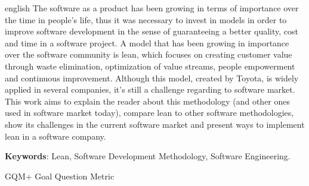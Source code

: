  
\begin{resumo}[ABSTRACT]
 \begin{otherlanguage*}{english}
 The software as a product has been growing in terms of importance over the time in people’s life, thus it was necessary to invest in models in order to improve software development in the sense of guaranteeing a better quality, cost and time in  a software project. A model that has been growing in importance over the software community is lean, which focuses on creating customer value through waste elimination, optimization of value streams, people empowerment and continuous improvement. Although this model, created by Toyota, is widely applied in several companies, it’s still a challenge regarding to software market. This work aims to explain the reader about this methodology (and other ones used in software market today), compare lean to other software methodologies, show its challenges in the current software market and present ways to implement lean in a software company.

\textbf{Keywords}: Lean, Software Development Methodology, Software Engineering.
 \end{otherlanguage*}
\end{resumo}


\listoffigures*
\cleardoublepage



\begin{siglas} %
  \item[GQM+] Goal Question Metric
\end{siglas}


 
\tableofcontents*
\cleardoublepage


